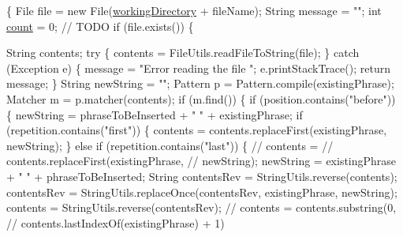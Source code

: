 \begin{DoxyCode}
                             \{
        File file = \textcolor{keyword}{new} File(\hyperlink{classcom_1_1poly_1_1nlp_1_1filekommander_1_1file_1_1actions_1_1_file_action_utils_ad54a8fdc9145d2f423c54cb1597f874a}{workingDirectory} + fileName);
        String message = \textcolor{stringliteral}{""};
        \textcolor{keywordtype}{int} \hyperlink{classcom_1_1poly_1_1nlp_1_1filekommander_1_1file_1_1actions_1_1_file_action_utils_a2df1aca8a703f77ff7ca700541d6fb6b}{count} = 0; \textcolor{comment}{// TODO}
        \textcolor{keywordflow}{if} (file.exists()) \{

            String contents;
            \textcolor{keywordflow}{try} \{
                contents = FileUtils.readFileToString(file);
            \} \textcolor{keywordflow}{catch} (Exception e) \{
                message = \textcolor{stringliteral}{"Error reading the file "};
                e.printStackTrace();
                \textcolor{keywordflow}{return} message;
            \}
            String newString = \textcolor{stringliteral}{""};
            Pattern p = Pattern.compile(existingPhrase);
            Matcher m = p.matcher(contents);
            \textcolor{keywordflow}{if} (m.find()) \{
                \textcolor{keywordflow}{if} (position.contains(\textcolor{stringliteral}{"before"})) \{
                    newString = phraseToBeInserted + \textcolor{stringliteral}{" "} + existingPhrase;
                    \textcolor{keywordflow}{if} (repetition.contains(\textcolor{stringliteral}{"first"})) \{
                        contents = contents.replaceFirst(existingPhrase,
                                newString);
                    \} \textcolor{keywordflow}{else} \textcolor{keywordflow}{if} (repetition.contains(\textcolor{stringliteral}{"last"})) \{ \textcolor{comment}{// contents =}
                                                                \textcolor{comment}{//
       contents.replaceFirst(existingPhrase,}
                                                                \textcolor{comment}{// newString);}
                        newString = existingPhrase + \textcolor{stringliteral}{" "} + phraseToBeInserted;
                        String contentsRev = StringUtils.reverse(contents);
                        contentsRev = StringUtils.replaceOnce(contentsRev,
                                existingPhrase, newString);
                        contents = StringUtils.reverse(contentsRev);
                        \textcolor{comment}{// contents = contents.substring(0,}
                        \textcolor{comment}{// contents.lastIndexOf(existingPhrase) + 1)}

\end{DoxyCode}
